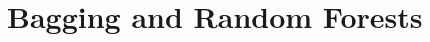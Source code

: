 \documentclass[aspectratio=169,usenames,dvipsnames]{beamer}
\newcommand{\InstructorList}[1]{
\begin{itemize}
	\color{orange}
	#1
\end{itemize}
}
\begin{document}



\section{Bagging and Random Forests}
\end{document}
